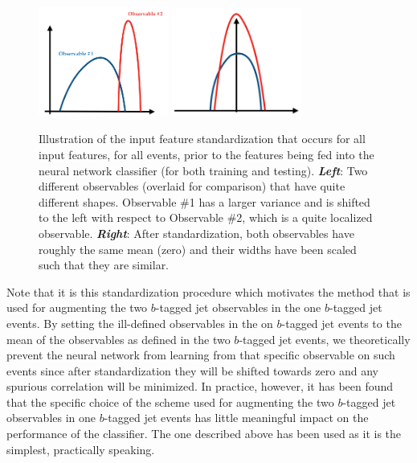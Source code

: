 \begin{figure}[!htb]
    \begin{center}
        \includegraphics[width=0.38\textwidth]{figures/search_hh/mva/feature_standard_1}
        \includegraphics[width=0.38\textwidth]{figures/search_hh/mva/feature_standard_2}
        \caption{
            Illustration of the input feature standardization that occurs for all input features,
            for all events, prior to the features being fed into the neural network classifier
            (for both training and testing).
            \textit{\textbf{Left}}: Two different observables (overlaid for comparison) that have quite
            different shapes. Observable \#1 has a larger variance and is shifted to the left with
            respect to Observable \#2, which is a quite localized observable.
            \textit{\textbf{Right}}: After standardization, both observables have roughly the same
            mean (zero) and their widths have been scaled such that they are similar.
        }
        \label{fig:nn_feature_standard}
    \end{center}
\end{figure}

Note that it is this standardization procedure which motivates the method that
is used for augmenting the two $b$-tagged jet observables in the one $b$-tagged jet events.
By setting the ill-defined observables in the on $b$-tagged jet events to the mean of the observables
as defined in the two $b$-tagged jet events, we theoretically prevent the neural network from learning
from that specific observable on such events since after standardization they will be shifted towards zero
and any spurious correlation will be minimized.
In practice, however, it has been found that the specific choice of the scheme used for augmenting the two $b$-tagged jet observables
in one $b$-tagged jet events has little meaningful impact on the performance of the classifier.
The one described above has been used as it is the simplest, practically speaking.


